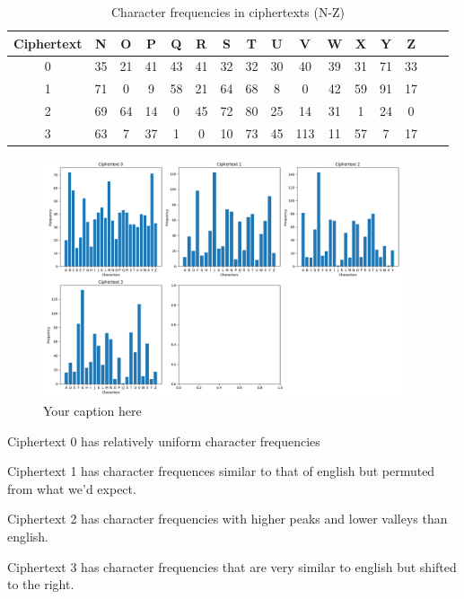\documentclass[11pt]{article}
\begin{document}
    \begin{table}[h]
    \centering
    \begin{tabular}{|c|c|c|c|c|c|c|c|c|c|c|c|c|c|c|c|}
    \hline
    Ciphertext & N & O & P & Q & R & S & T & U & V & W & X & Y & Z \\
    \hline
    0 & 35 & 21 & 41 & 43 & 41 & 32 & 32 & 30 & 40 & 39 & 31 & 71 & 33 \\
    \hline
    1 & 71 & 0 & 9 & 58 & 21 & 64 & 68 & 8 & 0 & 42 & 59 & 91 & 17 \\
    \hline
    2 & 69 & 64 & 14 & 0 & 45 & 72 & 80 & 25 & 14 & 31 & 1 & 24 & 0 \\
    \hline
    3 & 63 & 7 & 37 & 1 & 0 & 10 & 73 & 45 & 113 & 11 & 57 & 7 & 17 \\
    \hline
    \end{tabular}
    \caption{Character frequencies in ciphertexts (N-Z)}
    \label{tab:char_frequencies_N_Z}
    \end{table}

    \begin{figure}[h]
        \centering
        \includegraphics[width=400px]{Figure_1.png}
        \caption{Your caption here} %
        \label{fig:your_label} %
    \end{figure}


    Ciphertext 0 has relatively uniform character frequencies

    Ciphertext 1 has character frequences similar to that of english but permuted from what we'd expect.

    Ciphertext 2 has character frequencies with higher peaks and lower valleys than english.

    Ciphertext 3 has character frequencies that are very similar to english but shifted to the right.
    
\end{document}
